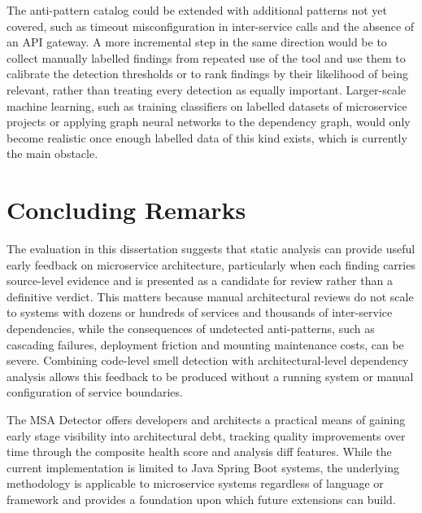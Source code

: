 \par The anti-pattern catalog could be extended with additional patterns not yet covered, such as timeout misconfiguration in inter-service calls and the absence of an API gateway. A more incremental step in the same direction would be to collect manually labelled findings from repeated use of the tool and use them to calibrate the detection thresholds or to rank findings by their likelihood of being relevant, rather than treating every detection as equally important. Larger-scale machine learning, such as training classifiers on labelled datasets of microservice projects or applying graph neural networks to the dependency graph, would only become realistic once enough labelled data of this kind exists, which is currently the main obstacle.

\section{Concluding Remarks}
\label{sec:concluding-remarks}

\par The evaluation in this dissertation suggests that static analysis can provide useful early feedback on microservice architecture, particularly when each finding carries source-level evidence and is presented as a candidate for review rather than a definitive verdict. This matters because manual architectural reviews do not scale to systems with dozens or hundreds of services and thousands of inter-service dependencies, while the consequences of undetected anti-patterns, such as cascading failures, deployment friction and mounting maintenance costs, can be severe. Combining code-level smell detection with architectural-level dependency analysis allows this feedback to be produced without a running system or manual configuration of service boundaries.


\par The MSA Detector offers developers and architects a practical means of gaining early stage visibility into architectural debt, tracking quality improvements over time through the composite health score and analysis diff features. While the current implementation is limited to Java Spring Boot systems, the underlying methodology is applicable to microservice systems regardless of language or framework and provides a foundation upon which future extensions can build.
